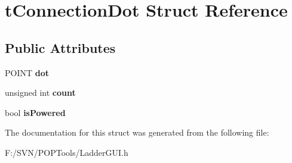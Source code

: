 \hypertarget{structt_connection_dot}{\section{t\-Connection\-Dot Struct Reference}
\label{structt_connection_dot}
}
\subsection*{Public Attributes}
\begin{DoxyCompactItemize}
\item 
\hypertarget{structt_connection_dot_a244f9d12a670cd0bb95bfaa0ff58f4f1}{P\-O\-I\-N\-T {\bfseries dot}}\label{structt_connection_dot_a244f9d12a670cd0bb95bfaa0ff58f4f1}

\item 
\hypertarget{structt_connection_dot_ab362928f44954b46288b224b6f89aff3}{unsigned int {\bfseries count}}\label{structt_connection_dot_ab362928f44954b46288b224b6f89aff3}

\item 
\hypertarget{structt_connection_dot_a144ce7d7fcf035a4f40265c7225aa4e2}{bool {\bfseries is\-Powered}}\label{structt_connection_dot_a144ce7d7fcf035a4f40265c7225aa4e2}

\end{DoxyCompactItemize}


The documentation for this struct was generated from the following file\-:\begin{DoxyCompactItemize}
\item 
F\-:/\-S\-V\-N/\-P\-O\-P\-Tools/Ladder\-G\-U\-I.\-h\end{DoxyCompactItemize}
